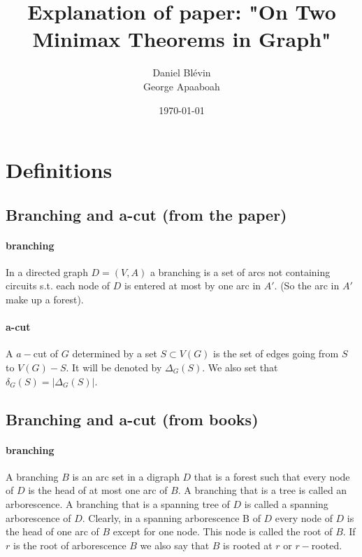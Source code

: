 \documentclass{article}
\title{Explanation of paper: "On Two Minimax Theorems in Graph"}
\author{Daniel Blévin\\George Apaaboah}
\date\today
\begin{document}
\maketitle
\tableofcontents

\newtheorem{edmonds_theorem}{THEOREM}
\section{Definitions}

\subsection*{Branching and a-cut (from the paper)}

\paragraph{branching}
In a directed graph $D = (V, A)$ a branching is a set of arcs not containing 
circuits s.t. each node of $D$ is entered at most by one arc in $A'$. 
(So the arc in $A'$ make up a forest). %

\paragraph{a-cut}
A $a-$cut of $G$ determined by a set $S \subset V(G)$ is the set of
edges going from $S$ to $V(G) - S$. 
It will be denoted by $\Delta_G(S)$.
We also set that $\delta_G(S) = |\Delta_G(S)|$.


\subsection*{Branching and a-cut (from books)}
\paragraph{branching}
A branching $B$ is an arc set in a digraph $D$ that is a forest such that every node of $D$ 
is the head of at most one arc of $B$. 
A branching that is a tree is called an arborescence.
A branching that is a spanning tree of $D$ is called a spanning arborescence of $D$. 
Clearly, in a spanning arborescence B of $D$ every node of $D$ is the head of one arc of $B$ 
except for one node. 
This node is called the root of $B$. 
If $r$ is the root of arborescence $B$ we also say that $B$ is rooted at $r$ or $r-$rooted.
\end{document}
